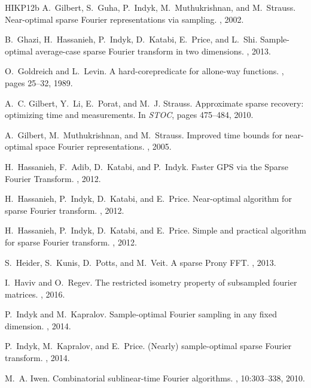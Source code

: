 \documentclass[11pt]{article}
\begin{document}
\begin{thebibliography}{HIKP12b}
A.~Gilbert, S.~Guha, P.~Indyk, M.~Muthukrishnan, and M.~Strauss.
\newblock Near-optimal sparse {F}ourier representations via sampling.
, 2002.

B.~Ghazi, H.~Hassanieh, P.~Indyk, D.~Katabi, E.~Price, and L.~Shi.
\newblock Sample-optimal average-case sparse {F}ourier transform in two
  dimensions.
, 2013.

O.~Goldreich and L.~Levin.
\newblock A hard-corepredicate for allone-way functions.
, pages 25--32, 1989.

A.~C. Gilbert, Y.~Li, E.~Porat, and M.~J. Strauss.
\newblock Approximate sparse recovery: optimizing time and measurements.
\newblock In {\em STOC}, pages 475--484, 2010.

A.~Gilbert, M.~Muthukrishnan, and M.~Strauss.
\newblock Improved time bounds for near-optimal space {F}ourier
  representations.
, 2005.

H.~Hassanieh, F.~Adib, D.~Katabi, and P.~Indyk.
\newblock Faster {GPS} via the {S}parse {F}ourier {T}ransform.
, 2012.

H.~Hassanieh, P.~Indyk, D.~Katabi, and E.~Price.
\newblock Near-optimal algorithm for sparse {F}ourier transform.
, 2012.

H.~Hassanieh, P.~Indyk, D.~Katabi, and E.~Price.
\newblock Simple and practical algorithm for sparse {F}ourier transform.
, 2012.

S.~Heider, S.~Kunis, D.~Potts, and M.~Veit.
\newblock A sparse {P}rony {FFT}.
, 2013.

I.~Haviv and O.~Regev.
\newblock The restricted isometry property of subsampled fourier matrices.
, 2016.

P.~Indyk and M.~Kapralov.
\newblock Sample-optimal {F}ourier sampling in any fixed dimension.
, 2014.

P.~Indyk, M.~Kapralov, and E.~Price.
\newblock ({N}early) sample-optimal sparse {F}ourier transform.
, 2014.

M.~A. Iwen.
\newblock Combinatorial sublinear-time {F}ourier algorithms.
, 10:303--338, 2010.


\end{thebibliography}
\end{document}
